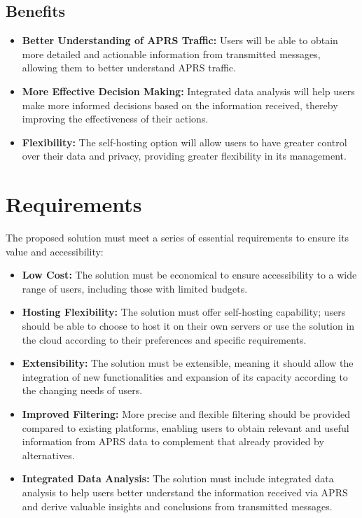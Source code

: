 \subsection{Benefits}

\begin{itemize}
	\item \textbf{Better Understanding of APRS Traffic:} Users will be able to obtain more detailed and actionable information from transmitted messages, allowing them to better understand APRS traffic.

	\item \textbf{More Effective Decision Making:} Integrated data analysis will help users make more informed decisions based on the information received, thereby improving the effectiveness of their actions.

	\item \textbf{Flexibility:} The self-hosting option will allow users to have greater control over their data and privacy, providing greater flexibility in its management.

\end{itemize}

\section{Requirements}

The proposed solution must meet a series of essential requirements to ensure its value and accessibility:

\begin{itemize}
	\item \textbf{Low Cost:} The solution must be economical to ensure accessibility to a wide range of users, including those with limited budgets.

	\item \textbf{Hosting Flexibility:} The solution must offer self-hosting capability; users should be able to choose to host it on their own servers or use the solution in the cloud according to their preferences and specific requirements.

	\item \textbf{Extensibility:} The solution must be extensible, meaning it should allow the integration of new functionalities and expansion of its capacity according to the changing needs of users.

	\item \textbf{Improved Filtering:} More precise and flexible filtering should be provided compared to existing platforms, enabling users to obtain relevant and useful information from APRS data to complement that already provided by alternatives.

	\item \textbf{Integrated Data Analysis:} The solution must include integrated data analysis to help users better understand the information received via APRS and derive valuable insights and conclusions from transmitted messages.

\end{itemize}